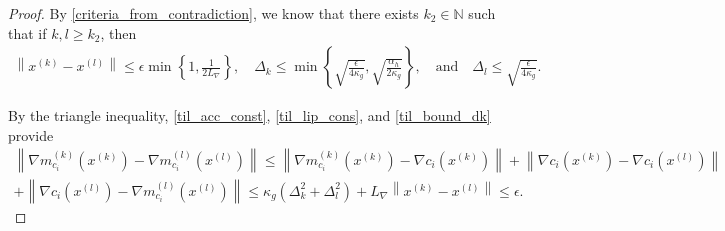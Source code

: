 \documentclass{article}
\theoremstyle{case}
\numberwithin{theorem}{subsection}
\newcommand{\dk}{\Delta_k}
\newcommand{\dl}{\Delta_l}
\newcommand{\gk}{{\nabla m_f^{(k)}\left(\xk\right)}}
\newcommand{\gl}{{\nabla m_f^{(l)}\left(\xl\right)}}
\newcommand{\gmcik}{{\nabla m_{c_i}^{(k)}\left(\xk\right)}}
\newcommand{\gmcil}{{\nabla m_{c_i}^{(l)}\left(\xl\right)}}
\newcommand{\lipgrad}{{L_{\nabla}}}
\newcommand{\naturals}{\mathbb N}
\newcommand{\xk}{x^{(k)}}
\newcommand{\xl}{{x^{(l)}}}
\newcommand{\huffeps}{{\epsilon_h}}
\newcommand{\huffalpha}{{\alpha_h}}
\begin{document}
\begin{proof}
By \cref{criteria_from_contradiction}, we know that there exists $k_2 \in \naturals$ such that if $k, l \ge k_2$, then
\begin{align}
\label{til_bound_dk}
\left\|\xk - \xl \right\| \le \epsilon \min\left\{1, \frac{1}{2\lipgrad}\right\},
\quad
\dk \le \min\left\{
\sqrt{\frac{\epsilon}{4\kappa_g}},
\sqrt{\frac{\huffalpha}{2\kappa_g}}\right\},
\quad \textrm{and} \quad
\dl \le \sqrt{\frac{\epsilon}{4\kappa_g}}.
\end{align}


By the triangle inequality, \cref{til_acc_const}, \cref{til_lip_cons}, and \cref{til_bound_dk} provide
\begin{align}
\left\| \gmcik - \gmcil \right\|
\le \left\| \gmcik - \nabla c_i\left(\xk\right) \right\|
+   \left\| \nabla c_i\left(\xk\right) - \nabla c_i\left(\xl\right) \right\| \nonumber \\
+   \left\| \nabla c_i\left(\xl\right) - \gmcil \right\|
\le \kappa_g \left(\dk^2 + \dl^2\right) + \lipgrad \left\|\xk - \xl\right\|  \le \epsilon. \label{til_gmc_close}
\end{align}





\end{proof}
\end{document}
